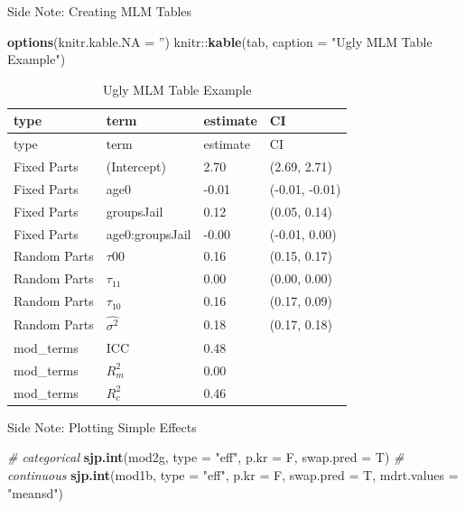 \documentclass[ignorenonframetext,]{beamer}
\newenvironment{Shaded}{\begin{snugshade}}{\end{snugshade}}
\newcommand{\KeywordTok}[1]{\textcolor[rgb]{0.13,0.29,0.53}{\textbf{{#1}}}}
\newcommand{\DataTypeTok}[1]{\textcolor[rgb]{0.13,0.29,0.53}{{#1}}}
\newcommand{\StringTok}[1]{\textcolor[rgb]{0.31,0.60,0.02}{{#1}}}
\newcommand{\CommentTok}[1]{\textcolor[rgb]{0.56,0.35,0.01}{\textit{{#1}}}}
\newcommand{\NormalTok}[1]{{#1}}
\begin{document}
\begin{frame}[fragile]{Side Note: Creating MLM Tables}

\small

\begin{Shaded}
\begin{Highlighting}[]
\KeywordTok{options}\NormalTok{(}\DataTypeTok{knitr.kable.NA =} \StringTok{''}\NormalTok{)}
\NormalTok{knitr::}\KeywordTok{kable}\NormalTok{(tab, }\DataTypeTok{caption =} \StringTok{"Ugly MLM Table Example"}\NormalTok{)}
\end{Highlighting}
\end{Shaded}

\begin{longtable}[]{@{}llll@{}}
\caption{Ugly MLM Table Example}\tabularnewline
\toprule
type & term & estimate & CI\tabularnewline
\midrule
\endfirsthead
\toprule
type & term & estimate & CI\tabularnewline
\midrule
\endhead
Fixed Parts & (Intercept) & 2.70 & (2.69, 2.71)\tabularnewline
Fixed Parts & age0 & -0.01 & (-0.01, -0.01)\tabularnewline
Fixed Parts & groupsJail & 0.12 & (0.05, 0.14)\tabularnewline
Fixed Parts & age0:groupsJail & -0.00 & (-0.01, 0.00)\tabularnewline
Random Parts & \(\tau{00}\) & 0.16 & (0.15, 0.17)\tabularnewline
Random Parts & \(\tau_{11}\) & 0.00 & (0.00, 0.00)\tabularnewline
Random Parts & \(\tau_{10}\) & 0.16 & (0.17, 0.09)\tabularnewline
Random Parts & \(\hat{\sigma^2}\) & 0.18 & (0.17, 0.18)\tabularnewline
mod\_terms & ICC & 0.48 &\tabularnewline
mod\_terms & \(R^2_m\) & 0.00 &\tabularnewline
mod\_terms & \(R^2_c\) & 0.46 &\tabularnewline
\bottomrule
\end{longtable}

\normalsize

\end{frame}

\begin{frame}[fragile]{Side Note: Plotting Simple Effects}

\footnotesize

\begin{Shaded}
\begin{Highlighting}[]
\CommentTok{# categorical}
\KeywordTok{sjp.int}\NormalTok{(mod2g, }\DataTypeTok{type =} \StringTok{"eff"}\NormalTok{, }\DataTypeTok{p.kr =} \NormalTok{F, }\DataTypeTok{swap.pred =} \NormalTok{T)}
\CommentTok{# continuous}
\KeywordTok{sjp.int}\NormalTok{(mod1b, }\DataTypeTok{type =} \StringTok{"eff"}\NormalTok{, }\DataTypeTok{p.kr =} \NormalTok{F, }\DataTypeTok{swap.pred =} \NormalTok{T, }
        \DataTypeTok{mdrt.values =} \StringTok{"meansd"}\NormalTok{)}
\end{Highlighting}
\end{Shaded}

\end{frame}
\end{document}
